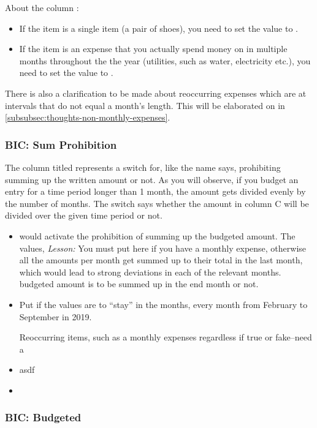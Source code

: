 About the column :
\begin{itemize}
	\item If the item is a single item (\eg a pair of shoes), you need to set the value to .
	\item If the item is an expense that you actually spend money on in multiple months throughout the the year (\eg utilities, such as water, electricity etc.), you need to set the value to .
\end{itemize}

There is also a clarification to be made about reoccurring expenses which are at intervals that do not equal a month's length.
This will be elaborated on in \autoref{subsubsec:thoughts-non-monthly-expenses}.

\subsubsection{BIC: Sum Prohibition}
\label{subsubsec:budgeting-item-column-sum-prohibition}

The column titled  represents a switch for, like the name says, prohibiting summing up the written amount or not.
As you will observe, if you budget an entry for a time period longer than 1 month, the amount gets divided evenly by the number of months.
The switch says whether the amount in column C will be divided over the given time period or not.
\begin{itemize}
	\item {} would activate the prohibition of summing up the budgeted amount.
	The values, 
	\emph{Lesson:} You must put  here if you have a monthly expense, otherwise all the amounts per month get summed up to their total in the last month, which would lead to strong deviations in each of the relevant months.
		budgeted amount is to be summed up in the end month or not.
	\item Put  if the values are to ``stay'' in the months, \ie every month from February to September in 2019.

	Reoccurring items, such as a monthly expenses regardless if true or fake--need a 
	\item asdf
	\item 
\end{itemize}

\subsubsection{BIC: Budgeted}
\label{subsubsec:budgeting-item-column-budgeted}


